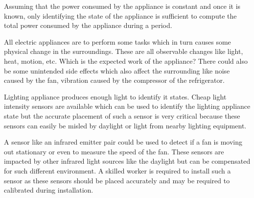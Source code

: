 Assuming that the power consumed by the appliance is constant and once it is known, only identifying the state of the appliance is sufficient to compute the total power consumed by the appliance during a period.

All electric appliances are to perform some tasks which in turn causes some physical change in the surroundings. These are all observable changes like light, heat, motion, etc. Which is the expected work of the appliance? There could also be some unintended side effects which also affect the surrounding like noise caused by the fan, vibration caused by the compressor of the refrigerator.

Lighting appliance produces enough light to identify it states. Cheap light intensity sensors are available which can be used to identify the lighting appliance state but the accurate placement of such a sensor is very critical because these sensors can easily be misled by daylight or light from nearby lighting equipment.

A sensor like an infrared emitter pair could be used to detect if a fan is moving out stationary or even to measure the speed of the fan. These sensors are impacted by other infrared light sources like the daylight but can be compensated for such different environment. A skilled worker is required to install such a sensor as these sensors should be placed accurately and may be required to calibrated during installation.

